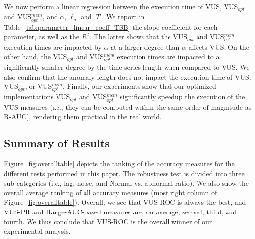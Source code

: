 We now perform a linear regression between the execution time of VUS, VUS$_{opt}$ and VUS$_{opt}^{mem}$, and $\alpha$, $\ell_a$ and $|T|$.
We report in Table~\ref{tab:parameter_linear_coeff_TSB} the slope coefficient for each parameter, as well as the $R^2$.  
The latter shows that the VUS$_{opt}$ and VUS$_{opt}^{mem}$ execution times are impacted by $\alpha$ at a larger degree than $\alpha$ affects VUS. 
On the other hand, the VUS$_{opt}$ and VUS$_{opt}^{mem}$ execution times are impacted to a significantly smaller degree by the time series length when compared to VUS. 
We also confirm that the anomaly length does not impact the execution time of VUS, VUS$_{opt}$, or VUS$_{opt}^{mem}$.
Finally, our experiments show that our optimized implementations VUS$_{opt}$ and VUS$_{opt}^{mem}$ significantly speedup the execution of the VUS measures (i.e., they can be computed within the same order of magnitude as R-AUC), rendering them practical in the real world.











\subsection{Summary of Results}


Figure~\ref{fig:overalltable} depicts the ranking of the accuracy measures for the different tests performed in this paper. The robustness test is divided into three sub-categories (i.e., lag, noise, and Normal vs. abnormal ratio). We also show the overall average ranking of all accuracy measures (most right column of Figure~\ref{fig:overalltable}).
Overall, we see that VUS-ROC is always the best, and VUS-PR and Range-AUC-based measures are, on average, second, third, and fourth. We thus conclude that VUS-ROC is the overall winner of our experimental analysis.

